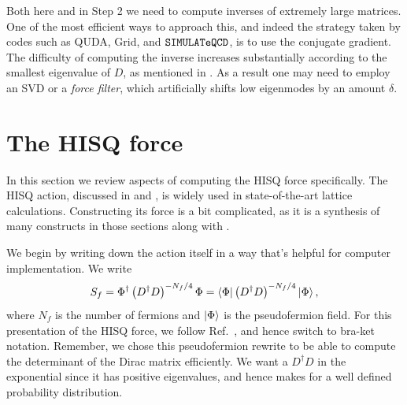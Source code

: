Both here and in Step 2 we need to compute inverses of extremely
large matrices. One of the most efficient ways to approach this,
and indeed the strategy taken by codes such as 
QUDA, 
Grid, and
$\texttt{SIMULATeQCD}$, is to use the conjugate gradient.
The difficulty of computing the inverse increases
substantially according to the smallest eigenvalue of $D$,
as mentioned in . As a result
one may need to employ an SVD or a
{\it force filter}, which artificially
shifts low eigenmodes by an amount $\delta$.

\section{The HISQ force}\label{sec:HISQforce}

In this section we review aspects of computing the HISQ force specifically.
The HISQ action, discussed in  and ,
is widely used in state-of-the-art lattice calculations. Constructing its
force is a bit complicated, as it is a synthesis of many constructs in
those sections along with . 

We begin by writing down the action itself in a way that's helpful
for computer implementation. We write
\begin{equation}
S_f=\Phi^\dagger\left(D^\dagger D\right)^{-N_f/4}\Phi
=\bra{\Phi}\left(D^{\dagger} D\right)^{-N_f/4}\ket{\Phi},
\end{equation}
where $N_f$ is the number of fermions and $\ket\Phi$ is the pseudofermion field.
For this presentation of the HISQ force, we follow
Ref.~\cite{Wong:2007uz}, and hence switch to bra-ket notation.
Remember, we chose this pseudofermion rewrite to be able to compute the
determinant of the Dirac matrix efficiently. We want a
$D^\dagger D$ in the exponential since it has positive eigenvalues,
and hence makes for a well defined probability distribution.

